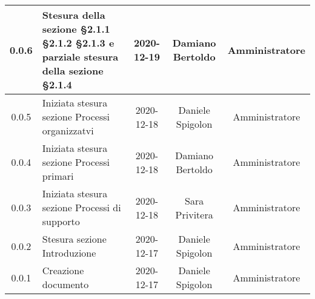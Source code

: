 \begin{center}
\begin{longtable}{|c|p{5cm}|c|c|c|}
	\hline
	0.0.6 & Stesura della sezione §2.1.1 §2.1.2 §2.1.3 e parziale stesura della sezione §2.1.4 & 2020-12-19 & Damiano Bertoldo & Amministratore \\
	\hline
	0.0.5 & Iniziata stesura sezione Processi organizzatvi & 2020-12-18 & Daniele Spigolon & Amministratore \\
	\hline
	0.0.4 & Iniziata stesura sezione Processi primari & 2020-12-18 & Damiano Bertoldo & Amministratore \\
	\hline
	0.0.3 & Iniziata stesura sezione Processi di supporto & 2020-12-18 & Sara Privitera & Amministratore \\
	\hline
	0.0.2 & Stesura sezione Introduzione & 2020-12-17 & Daniele Spigolon & Amministratore \\
	\hline
	0.0.1 & Creazione documento & 2020-12-17 & Daniele Spigolon & Amministratore \\
	\hline
	
	

	\end{longtable}
\end{center}
